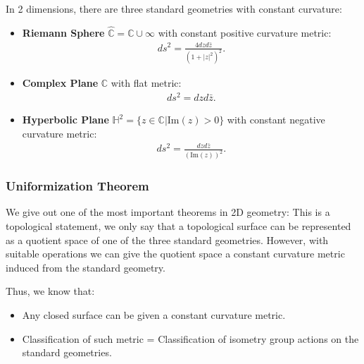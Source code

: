 In 2 dimensions, there are three standard geometries with constant curvature:
\begin{itemize}
  \item \textbf{Riemann Sphere} $ \hat{\mathbb{C}} = \mathbb{C}\cup
    \infty $ with constant positive curvature metric:
    \begin{align}
      ds^2=\frac{4dzd\bar{z}}{(1+|z|^2)^2}.
    \end{align}
  \item \textbf{Complex Plane} $ \mathbb{C} $ with flat metric:
    \begin{align}
      ds^2=dzd\bar{z}.
    \end{align}
  \item \textbf{Hyperbolic Plane} $ \mathbb{H}^2 =
    \{z\in\mathbb{C}|\text{Im}(z)>0\} $ with constant negative curvature metric:
    \begin{align}
      ds^2=\frac{dzd\bar{z}}{(\text{Im}(z))^2}.
    \end{align}
\end{itemize}

\subsubsection{Uniformization Theorem}

We give out one of the most important theorems in 2D geometry:
This is a topological statement, we only say that a topological
surface can be represented as a quotient space of one of the three
standard geometries. However, with suitable operations we can give
the quotient space a constant curvature metric induced from the
standard geometry. 

Thus, we know that:
\begin{itemize}
  \item Any closed surface can be given a constant curvature metric.
  \item Classification of such metric = Classification of isometry
    group actions on the standard geometries.
\end{itemize}
